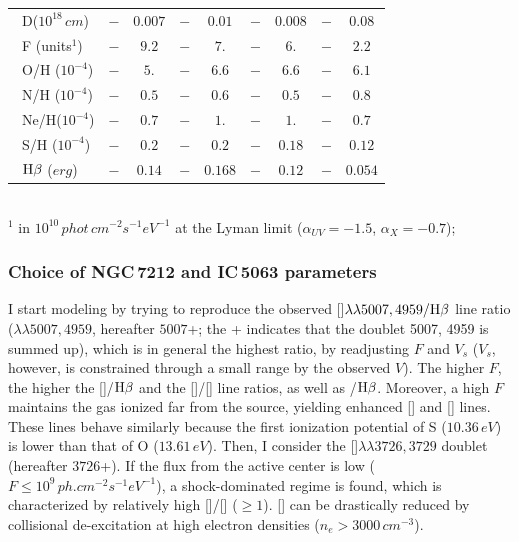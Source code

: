\documentclass[../main.tex]{subfiles}
\begin{document}
\begin{table}
\begin{tabular}{lcccccccc}
\ D($10^{18}\,\si{cm}$)      &$-      $&$ 0.007$&$-    $&$0.01  $&$-     $&$0.008 $&$-     $&$0.08  $\\            
\ F (units$^1$)       &$-      $&$ 9.2  $&$-    $&$7.    $&$-     $&$6.    $&$-    $&$2.2     $\\            
\ O/H ($10^{-4}$)     &$-      $&$ 5.   $&$-    $&$6.6   $&$-     $&$6.6   $&$-     $&$6.1     $\\            
\ N/H ($10^{-4}$)     &$-      $&$ 0.5  $&$-    $&$0.6   $&$-     $&$0.5   $&$-     $&$0.8     $\\            
\ Ne/H($10^{-4}$)     &$-      $&$ 0.7  $&$-    $&$1.    $&$-     $&$1.    $&$-     $&$0.7    $\\            
\ S/H ($10^{-4}$)     &$-      $&$ 0.2  $&$-    $&$0.2   $&$-     $&$0.18  $&$-     $&$0.12    $\\            
\ $\rm H\beta$ ($\si{erg}$)          &$-      $&$0.14  $&$-    $&$0.168 $&$-     $&$0.12  $&$-     $&$0.054   $\\            
\hline
\end{tabular}
\\
$^1$ in $10^{10}\,\si{phot\,cm^{-2} s^{-1} eV^{-1}}$ at the Lyman limit
(${\alpha}_{UV}=-1.5$, ${\alpha}_X=-0.7$);

\end{table}

\subsubsection{Choice of  NGC\,7212 and IC\,5063 parameters}
\label{sec:parameters}

I start modeling by trying to reproduce the observed []$\lambda\lambda5007,4959/\rm H\beta$ line ratio ($\lambda\lambda5007,4959$, hereafter $5007$+; the + indicates that the doublet 5007, 4959 is summed up), which is in general  the highest  ratio, by readjusting $F$ and $V_s$ ($V_s$, however, is constrained through a small range by the observed $V$). 
The higher $F$, the higher the []/$\rm H\beta$ and the []/[] line ratios, as well as /$\rm H\beta$. 
Moreover, a high $F$ maintains the gas ionized far from the source, yielding enhanced [] and [] lines. 
These lines behave similarly because the first ionization potential of S ($10.36\,\si{ eV}$) is lower than that of O ($13.61\,\si{ eV}$).
Then, I consider the []$\lambda\lambda3726,3729$ doublet (hereafter $3726$+). 
If the flux from the active center is low ($F \leq 10^9\,\si{ph.cm^{-2} s^{-1} eV^{-1}}$), a shock-dominated regime is found, which is characterized by relatively high []/[] ($\geq 1$). 
[] can be drastically reduced by collisional de-excitation at high electron densities ($n_e >  3000\,\si{cm^{-3}}$).
\end{document}
